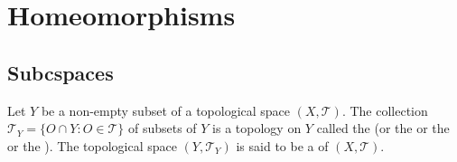 \documentclass[../main.tex]{subfiles}
\begin{document}
\ifSubfilesClassLoaded{

    \tableofcontents
    
}{}

\chapter{ Homeomorphisms }

\section{Subcspaces}

\begin{definition}{}{}
Let $Y$ be a non-empty subset of a topological space $(X, \mathcal{T})$. The collection $\mathcal{T}_Y = \{O \cap Y : O \in \mathcal{T}\}$ of subsets of $Y$ is a topology on $Y$ called the  (or the  or the  or the ). The topological space $(Y, \mathcal{T}_Y)$ is said to be a  of $(X, \mathcal{T})$.
\end{definition}
\end{document}
